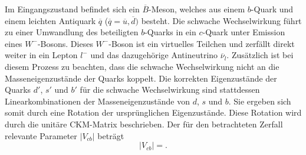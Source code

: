 Im Eingangszustand befindet sich ein $\overline B$-Meson, welches aus einem $b$-Quark und einem leichten Antiquark $\overline q$ ($ \overline q = \overline u, \overline d)$ besteht.
Die schwache Wechselwirkung führt zu einer Umwandlung des beteiligten $b$-Quarks in ein $c$-Quark unter Emission eines $W^{-}$-Bosons. Dieses $W^{-}$-Boson ist ein virtuelles Teilchen und zerfällt direkt weiter in ein Lepton $l^-$ und das dazugehörige Antineutrino $\overline \nu_l$.  
Zusätzlich ist bei diesem Prozess zu beachten, dass die schwache Wechselwirkung nicht an die Masseneigenzustände der Quarks koppelt.
Die korrekten Eigenzustände der Quarks $d'$, $s'$ und $b'$ für die schwache Wechselwirkung sind stattdessen Linearkombinationen der Masseneigenzustände von $d$, $s$ und $b$. Sie ergeben sich somit durch eine Rotation der ursprünglichen Eigenzustände.
Diese Rotation wird durch die unitäre CKM-Matrix beschrieben.
Der für den betrachteten Zerfall relevante Parameter $\lvert V_{cb} \rvert$ beträgt \cite{Bigi2017441}
\begin{equation}
  \lvert V_{cb} \rvert = .
\end{equation}

